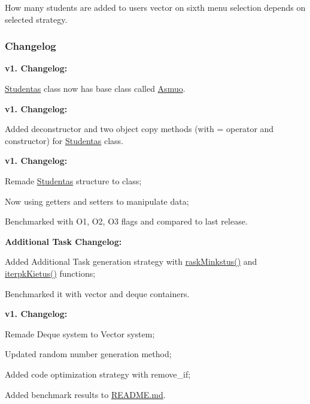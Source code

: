 How many students are added to {\ttfamily users} vector on sixth menu selection depends on selected strategy.





\subsubsection*{Changelog}

{\bfseries{v1. Changelog\+:}}
\begin{DoxyItemize}
\item \mbox{\hyperlink{class_studentas}{Studentas}} class now has base class called \mbox{\hyperlink{class_asmuo}{Asmuo}}.
\end{DoxyItemize}

{\bfseries{v1. Changelog\+:}}
\begin{DoxyItemize}
\item Added deconstructor and two object copy methods (with {\ttfamily =} operator and constructor) for \mbox{\hyperlink{class_studentas}{Studentas}} class.
\end{DoxyItemize}

{\bfseries{v1. Changelog\+:}}
\begin{DoxyItemize}
\item Remade \mbox{\hyperlink{class_studentas}{Studentas}} structure to class;
\item Now using getters and setters to manipulate data;
\item Benchmarked with {\ttfamily O1}, {\ttfamily O2}, {\ttfamily O3} flags and compared to last release.
\end{DoxyItemize}

{\bfseries{Additional Task Changelog\+:}}
\begin{DoxyItemize}
\item Added Additional Task generation strategy with {\ttfamily \mbox{\hyperlink{main_8cpp_a225b9876f074b8ecbe01fd6677c28daa}{rask\+Minkstus()}}} and {\ttfamily \mbox{\hyperlink{main_8cpp_a722ff3f683bf425a535be93e8bd2fa7e}{iterpk\+Kietus()}}} functions;
\item Benchmarked it with vector and deque containers.
\end{DoxyItemize}

{\bfseries{v1. Changelog\+:}}
\begin{DoxyItemize}
\item Remade Deque system to Vector system;
\item Updated random number generation method;
\item Added code optimization strategy with remove\+\_\+if;
\item Added benchmark results to \mbox{\hyperlink{_r_e_a_d_m_e_8md}{R\+E\+A\+D\+M\+E.\+md}}.
\end{DoxyItemize}

